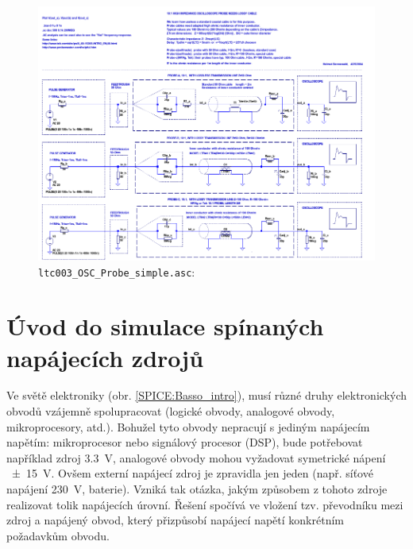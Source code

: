     \begin{figure}[ht!]
      \centering
      \includegraphics[width=1\linewidth]{../ltspice/ltc002_OSC_Probe.pdf}
      \caption{\texttt{ltc003\_OSC\_Probe\_simple.asc}: }
      \label{SPICE:fig_ltc002_OSC}
    \end{figure}
    
  \section{Úvod do simulace spínaných napájecích zdrojů}
    
    Ve světě elektroniky (obr. \ref{SPICE:Basso_intro}), musí různé druhy elektronických obvodů 
    vzájemně spolupracovat (logické obvody, analogové obvody, mikroprocesory, atd.). Bohužel tyto 
    obvody nepracují s jediným napájecím napětím: mikroprocesor nebo signálový procesor (DSP), bude 
    potřebovat například zdroj \SI{3.3}{\volt}, analogové obvody mohou vyžadovat symetrické nápení 
    \SI{\pm15}{\volt}. Ovšem externí napájecí zdroj je zpravidla jen jeden (např. síťové napájení 
    \SI{230}{\volt}, baterie). Vzniká tak otázka, jakým způsobem z tohoto zdroje realizovat tolik 
    napájecích úrovní. Řešení spočívá ve vložení tzv. převodníku mezi zdroj a napájený obvod, který 
    přizpůsobí napájecí napětí konkrétním požadavkům obvodu.
    
